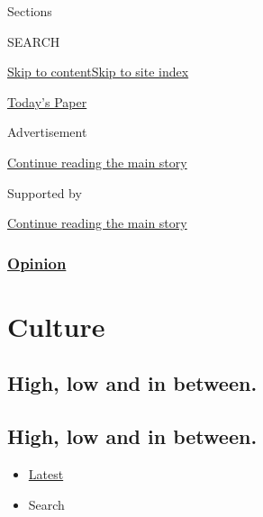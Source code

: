 Sections

SEARCH

\protect\hyperlink{site-content}{Skip to
content}\protect\hyperlink{site-index}{Skip to site index}

\href{https://myaccount.nytimes.com/auth/login?response_type=cookie\&client_id=vi}{}

\href{https://www.nytimes.com/section/todayspaper}{Today's Paper}

Advertisement

\protect\hyperlink{after-top}{Continue reading the main story}

Supported by

\protect\hyperlink{after-sponsor}{Continue reading the main story}

\hypertarget{opinion}{%
\subsubsection{\texorpdfstring{\href{/section/opinion}{Opinion}}{Opinion}}\label{opinion}}

\hypertarget{culture}{%
\section{Culture}\label{culture}}

\hypertarget{high-low-and-in-between}{%
\subsection{High, low and in between.}\label{high-low-and-in-between}}

\hypertarget{high-low-and-in-between-1}{%
\subsection{High, low and in between.}\label{high-low-and-in-between-1}}

\begin{itemize}
\tightlist
\item
  \protect\hyperlink{stream-panel}{Latest}
\item
  Search
\end{itemize}

